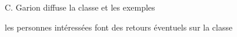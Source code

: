 \documentclass[french,cr]{supaero-mins}
\begin{document}






\begin{actions}
\item C. Garion diffuse la classe et les exemples
\item les personnes intéressées font des retours éventuels sur la
  classe
\end{actions}
\end{document}
